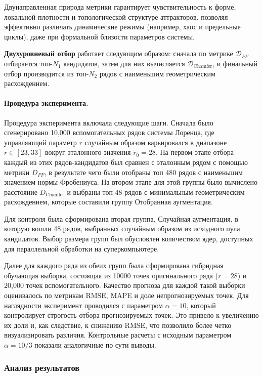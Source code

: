 \documentclass[a4paper,12pt]{extarticle}
\begin{document}
Двунаправленная природа метрики гарантирует чувствительность к форме,
 локальной плотности и топологической структуре аттракторов, позволяя
 эффективно различать динамические режимы (например, хаос и предельные циклы), даже при
  формальной близости параметров системы.

\textbf{Двухуровневый отбор} работает следующим образом: сначала по метрике $\mathcal{D}_{PF}$ 
отбирается топ-$N_1$ кандидатов, затем для них вычисляется $\mathcal{D}_{\text{Chamfer}}$, и 
финальный отбор производится из топ-$N_2$ рядов с наименьшим геометрическим расхождением.

\paragraph{Процедура эксперимента.}
Процедура эксперимента включала следующие шаги. Сначала было сгенерировано 10,000
 вспомогательных рядов системы Лоренца, где управляющий параметр $r$ случайным 
 образом варьировался в диапазоне $r \in [23, 33]$ вокруг эталонного значения $r_0=28$. 
 На первом этапе отбора каждый из этих рядов-кандидатов был сравнен с эталонным рядом с 
 помощью метрики $D_{PF}$, в результате чего были отобраны топ 480 рядов с наименьшим 
 значением нормы Фробениуса. На втором этапе для этой группы было вычислено расстояние $D_{\text{Chamfer}}$ и выбраны 
топ 48 рядов с минимальным геометрическим расхождением, которые составили группу Отобранная аугментация.

Для контроля была сформирована вторая группа, Случайная аугментация, в которую вошли 48 рядов,
 выбранных случайным образом из исходного пула кандидатов. Выбор размера групп был обусловлен количеством
  ядер, доступных для параллельной обработки на суперкомпьютере.

Далее для каждого ряда из обеих групп была сформирована гибридная обучающая выборка, состоящая из 10000 
точек оригинального ряда ($r=28$) и 20,000 точек вспомогательного. Качество прогноза для каждой такой выборки
 оценивалось по метрикам RMSE, MAPE и доле непрогнозируемых точек. Для наглядности эксперимент проводился 
 с параметром $\alpha=10$, который контролирует строгость отбора прогнозируемых точек. Это привело к увеличению
  их доли и, как следствие, к снижению RMSE, что позволило более четко визуализировать различия. Контрольные 
  расчеты с исходным параметром $\alpha=10/3$ показали аналогичные по сути выводы.
\subsubsection{Анализ результатов}
\end{document}

